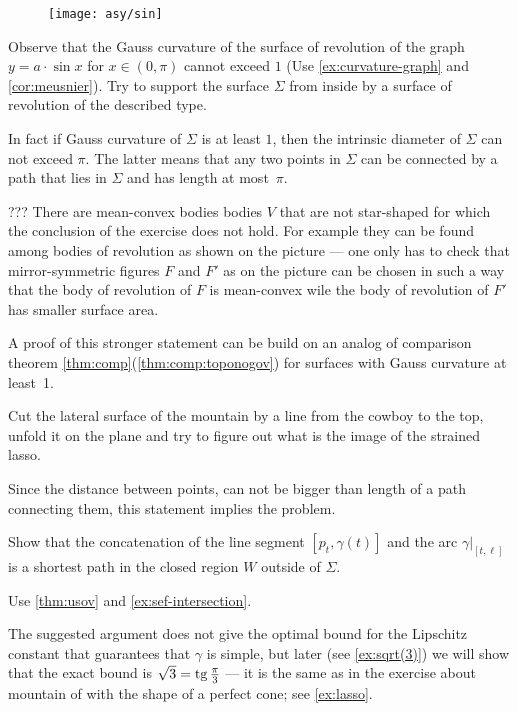 \begin{figure}[h!]
\vskip-0mm
\centering
\texttt{[image: asy/sin]}
\vskip-0mm
\end{figure}

Observe that the Gauss curvature of the surface of revolution of the graph $y=a\cdot \sin x$ for $x\in(0,\pi)$ cannot exceed $1$ (Use \ref{ex:curvature-graph} and \ref{cor:meusnier}).
Try to support the surface $\Sigma$ from inside by a surface of revolution of the described type. 

In fact if Gauss curvature of $\Sigma$ is at least $1$,
then
the intrinsic diameter of $\Sigma$ can not exceed $\pi$.
The latter means that any two points in $\Sigma$ can be connected by a path that lies in $\Sigma$ and has length at most~$\pi$.

 ???
There are mean-convex bodies bodies $V$ that are not star-shaped for which the conclusion of the exercise does not hold.
For example they can be found among bodies of revolution as shown on the picture --- one only has to check that mirror-symmetric figures $F$ and $F'$ as on the picture can be chosen in such a way that the body of revolution of $F$ is mean-convex wile the body of revolution of $F'$ has smaller surface area. 

A proof of this stronger statement can be build on an analog of comparison theorem \ref{thm:comp}(\ref{thm:comp:toponogov}) for surfaces with Gauss curvature at least~1.

 Cut the lateral surface of the mountain by a line from the cowboy to the top, unfold it on the plane and try to figure out what is the image of the strained lasso.

Since the distance between points, can not be bigger than length of a path connecting them,
this statement implies the problem.


 Show that the concatenation of the line segment $[p_t,\gamma(t)]$ and the arc $\gamma|_{[t,\ell]}$ is a shortest path in the closed region $W$ outside of $\Sigma$.

 Use \ref{thm:usov} and \ref{ex:sef-intersection}.

The suggested argument does not give the optimal bound for the Lipschitz constant that guarantees that $\gamma$ is simple, but
later (see \ref{ex:sqrt(3)}) we will show that the exact bound is $\sqrt{3}=\operatorname{tg}\tfrac\pi3$ --- it is the same as in the exercise about mountain of with the shape of a perfect cone; see \ref{ex:lasso}.

